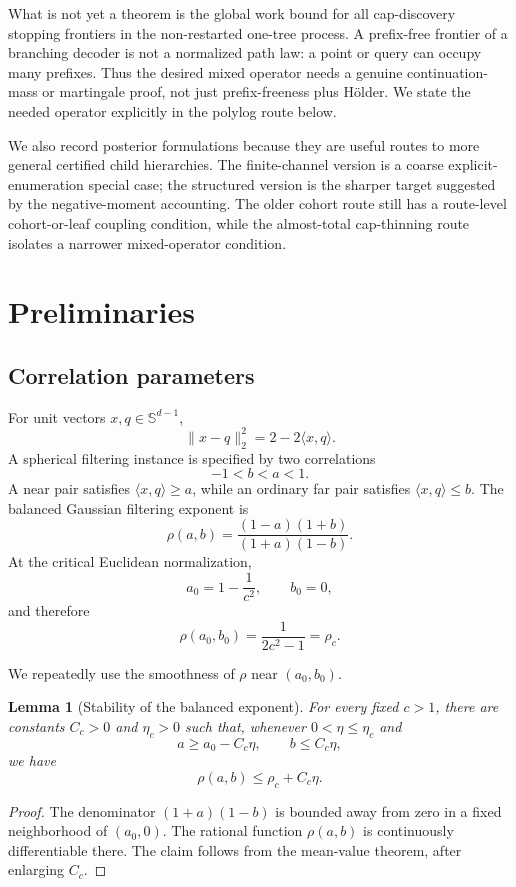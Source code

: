 \documentclass[10pt]{article}
\newtheorem{lemma}[theorem]{Lemma}
\theoremstyle{definition}
\newcommand{\ip}[2]{\langle #1,#2\rangle}
\begin{document}
What is not yet a theorem is the global work bound for all cap-discovery stopping frontiers in the non-restarted one-tree process. A prefix-free frontier of a branching decoder is not a normalized path law: a point or query can occupy many prefixes. Thus the desired mixed operator needs a genuine continuation-mass or martingale proof, not just prefix-freeness plus Hölder. We state the needed operator explicitly in the polylog route below.

We also record posterior formulations because they are useful routes to more general certified child hierarchies. The finite-channel version is a coarse explicit-enumeration special case; the structured version is the sharper target suggested by the negative-moment accounting. The older cohort route still has a route-level cohort-or-leaf coupling condition, while the almost-total cap-thinning route isolates a narrower mixed-operator condition.

\section{Preliminaries}

\subsection{Correlation parameters}

For unit vectors $x,q\in\mathbb{S}^{d-1}$,
\[
   \|x-q\|_2^2=2-2\ip{x}{q}.
\]
A spherical filtering instance is specified by two correlations
\[
   -1<b<a<1.
\]
A near pair satisfies $\ip{x}{q}\ge a$, while an ordinary far pair satisfies $\ip{x}{q}\le b$. The balanced Gaussian filtering exponent is
\[
   \rho(a,b)
   =
   \frac{(1-a)(1+b)}{(1+a)(1-b)}.
\]
At the critical Euclidean normalization,
\[
   a_0=1-\frac{1}{c^2},
   \qquad
   b_0=0,
\]
and therefore
\[
   \rho(a_0,b_0)=\frac{1}{2c^2-1}=\rho_c.
\]

We repeatedly use the smoothness of $\rho$ near $(a_0,b_0)$.

\begin{lemma}[Stability of the balanced exponent]\label{lem:rho-stability}
   For every fixed $c>1$, there are constants $C_c>0$ and $\eta_c>0$ such that, whenever $0<\eta\le\eta_c$ and
   \[
      a\ge a_0-C_c\eta,
      \qquad
      b\le C_c\eta,
   \]
   we have
   \[
      \rho(a,b)\le \rho_c+C_c\eta.
   \]
\end{lemma}

\begin{proof}
   The denominator $(1+a)(1-b)$ is bounded away from zero in a fixed neighborhood of $(a_0,0)$. The rational function $\rho(a,b)$ is continuously differentiable there. The claim follows from the mean-value theorem, after enlarging $C_c$.
\end{proof}
\end{document}
